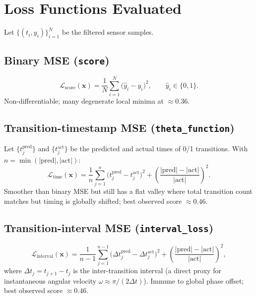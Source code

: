\documentclass[11pt,a4paper]{article}
\begin{document}
\section{Loss Functions Evaluated}

Let $\{(t_i, y_i)\}_{i=1}^{N}$ be the filtered sensor samples.

\subsection{Binary MSE (\texttt{score})}
\begin{equation}
  \mathcal{L}_{\text{score}}(\mathbf{x})
  = \frac{1}{N}\sum_{i=1}^{N}\!\bigl(\hat{y}_i - y_i\bigr)^2,
  \qquad \hat{y}_i \in \{0,1\}.
\end{equation}
Non-differentiable; many degenerate local minima at $\approx 0.36$.

\subsection{Transition-timestamp MSE (\texttt{theta\_function})}
Let $\{t^{\text{pred}}_j\}$ and $\{t^{\text{act}}_j\}$ be the predicted and
actual times of 0/1 transitions.  With $n=\min(|\text{pred}|,|\text{act}|)$:
\begin{equation}
  \mathcal{L}_{\text{time}}(\mathbf{x})
  = \frac{1}{n}\sum_{j=1}^{n}\!\bigl(t^{\text{pred}}_j - t^{\text{act}}_j\bigr)^2
  + \left(\frac{|\text{pred}|-|\text{act}|}{|\text{act}|}\right)^{\!2}.
\end{equation}
Smoother than binary MSE but still has a flat valley where total transition
count matches but timing is globally shifted; best observed score $\approx 0.46$.

\subsection{Transition-interval MSE (\texttt{interval\_loss})}
\begin{equation}
  \mathcal{L}_{\text{interval}}(\mathbf{x})
  = \frac{1}{n-1}\sum_{j=1}^{n-1}
    \!\bigl(\Delta t^{\text{pred}}_j - \Delta t^{\text{act}}_j\bigr)^2
  + \left(\frac{|\text{pred}|-|\text{act}|}{|\text{act}|}\right)^{\!2},
\end{equation}
where $\Delta t_j = t_{j+1}-t_j$ is the inter-transition interval (a
direct proxy for instantaneous angular velocity $\omega \approx \pi/(2\Delta
t)$).  Immune to global phase offset; best observed score $\approx 0.46$.
\end{document}
